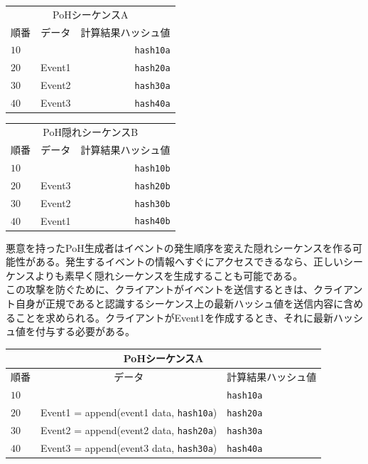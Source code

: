 \documentclass[12pt]{ltjsarticle}
\begin{document}
\begin{center}
  \begin{tabular}{ | l c r |}
    \hline
    \multicolumn{3}{|c|}{PoHシーケンスA} \\
    順番 & データ & 計算結果ハッシュ値  \\ \hline
    $10$ & & \texttt{hash10a} \\ 
    $20$ & Event1 & \texttt{hash20a} \\ 
    $30$ & Event2 & \texttt{hash30a} \\ 
    $40$ & Event3 & \texttt{hash40a} \\
    \hline
    \end{tabular}
  \begin{tabular}{ | l c r |}
    \hline
    \multicolumn{3}{|c|}{PoH隠れシーケンスB} \\
    順番 & データ & 計算結果ハッシュ値  \\ \hline
    $10$ & & \texttt{hash10b}\\ 
    $20$ & Event3 & \texttt{hash20b}  \\ 
    $30$ & Event2 & \texttt{hash30b} \\ 
    $40$ & Event1 & \texttt{hash40b} \\
    \hline
    \end{tabular}
\end{center}

悪意を持ったPoH生成者はイベントの発生順序を変えた隠れシーケンスを作る可能性がある。発生するイベントの情報へすぐにアクセスできるなら、正しいシーケンスよりも素早く隠れシーケンスを生成することも可能である。\\

この攻撃を防ぐために、クライアントがイベントを送信するときは、クライアント自身が正規であると認識するシーケンス上の最新ハッシュ値を送信内容に含めることを求められる。クライアントがEvent1を作成するとき、それに最新ハッシュ値を付与する必要がある。\\

\begin{center}
  \begin{tabular}{  l  c l}

    \multicolumn{3}{c}{PoHシーケンスA} \\
    \hline
    順番  & データ & 計算結果ハッシュ値 \\ \hline
    $10$ & & \texttt{hash10a} \\ 
    $20$ & Event1 = append(event1 data, \texttt{hash10a}) & \texttt{hash20a}  \\ 
    $30$ & Event2 = append(event2 data, \texttt{hash20a}) & \texttt{hash30a} \\ 
    $40$ &  Event3 = append(event3 data, \texttt{hash30a}) & \texttt{hash40a} \\
    \end{tabular}
\end{center}
\end{document}
